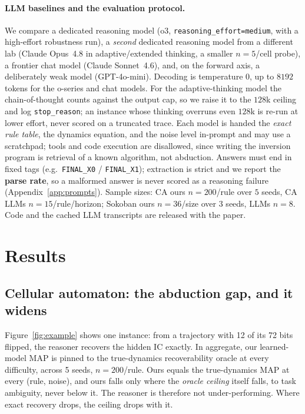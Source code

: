\documentclass{article}
\begin{document}
\paragraph{LLM baselines and the evaluation protocol.}
We compare a dedicated reasoning model (o3, \texttt{reasoning\_effort=medium}, with a high-effort
robustness run), a \emph{second} dedicated reasoning model from a different lab (Claude Opus~4.8 in
adaptive/extended thinking, a smaller $n=5$/cell probe), a frontier chat model (Claude Sonnet~4.6),
and, on the forward axis, a deliberately weak model (GPT-4o-mini). Decoding is temperature $0$, up to
$8192$ tokens for the o-series and chat models. For the adaptive-thinking model the chain-of-thought
counts against the output cap, so we raise it to the $128$k ceiling and log \texttt{stop\_reason}; an
instance whose thinking overruns even $128$k is re-run at lower effort, never scored on a truncated
trace. Each model is
handed the \emph{exact rule table}, the dynamics equation, and the noise level in-prompt and may use a
scratchpad; tools and code execution are disallowed, since writing the inversion program is retrieval
of a known algorithm, not abduction. Answers must end in fixed tags (e.g.\ \texttt{FINAL\_X0} /
\texttt{FINAL\_X1}); extraction is strict and we report the \textbf{parse rate}, so a malformed answer
is never scored as a reasoning failure (Appendix~\ref{app:prompts}). Sample sizes: CA ours
$n{=}200$/rule over $5$ seeds, CA LLMs $n{=}15$/rule/horizon; Sokoban ours $n{=}36$/size over $3$
seeds, LLMs $n{=}8$. Code and the cached LLM transcripts are released with the paper.

\section{Results}
\label{sec:results}

\subsection{Cellular automaton: the abduction gap, and it widens}



Figure~\ref{fig:example} shows one instance: from a trajectory with 12 of its 72 bits flipped, the
reasoner recovers the hidden IC exactly. In aggregate, our learned-model MAP is pinned to the
true-dynamics recoverability oracle at every difficulty, across 5 seeds, $n=200$/rule. Ours equals the true-dynamics MAP at every (rule, noise),
and ours falls only where the \emph{oracle ceiling} itself falls, to task ambiguity, never below it.
The reasoner is therefore not under-performing. Where exact recovery drops, the ceiling drops with
it.
\end{document}
